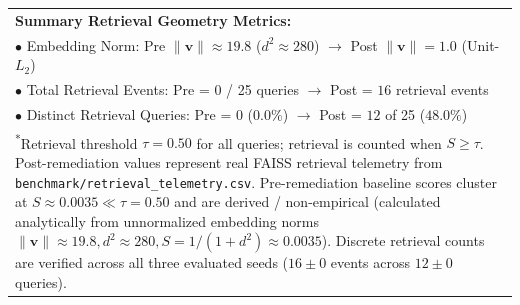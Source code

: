 \begin{table}[t]
\begin{tabular}{lcccc}
\multicolumn{5}{l}{\textbf{Summary Retrieval Geometry Metrics:}} \\
\multicolumn{5}{l}{$\bullet$ Embedding Norm: Pre $\|\mathbf{v}\| \approx 19.8$ ($d^2 \approx 280$) $\to$ Post $\|\mathbf{v}\| = 1.0$ (Unit-$L_2$)} \\
\multicolumn{5}{l}{$\bullet$ Total Retrieval Events: Pre = $0$ / 25 queries $\to$ Post = $16$ retrieval events} \\
\multicolumn{5}{l}{$\bullet$ Distinct Retrieval Queries: Pre = $0$ ($0.0\%$) $\to$ Post = $12$ of 25 ($48.0\%$)} \\
\bottomrule
\multicolumn{5}{p{8.2cm}}{\scriptsize \textsuperscript{*}Retrieval threshold $\tau=0.50$ for all queries; retrieval is counted when $S\geq\tau$. Post-remediation values represent real FAISS retrieval telemetry from \texttt{benchmark/retrieval\_telemetry.csv}. Pre-remediation baseline scores cluster at $S \approx 0.0035 \ll \tau = 0.50$ and are derived / non-empirical (calculated analytically from unnormalized embedding norms $\|\mathbf{v}\| \approx 19.8, d^2 \approx 280, S = 1/(1+d^2) \approx 0.0035$). Discrete retrieval counts are verified across all three evaluated seeds ($16 \pm 0$ events across $12 \pm 0$ queries).} \\
\end{tabular}
\end{table}
